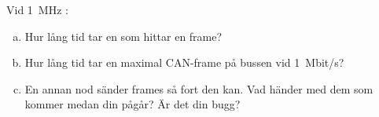 \label{ex:8:5}
Vid 1~MHz :
\begin{enumerate}[a)]
  \item Hur lång tid tar en  som hittar en frame?
  \item Hur lång tid tar en maximal CAN-frame på bussen vid 1~Mbit/s?
  \item En annan nod sänder frames så fort den kan. Vad händer med dem som kommer medan din
     pågår? Är det din bugg?
\end{enumerate}
